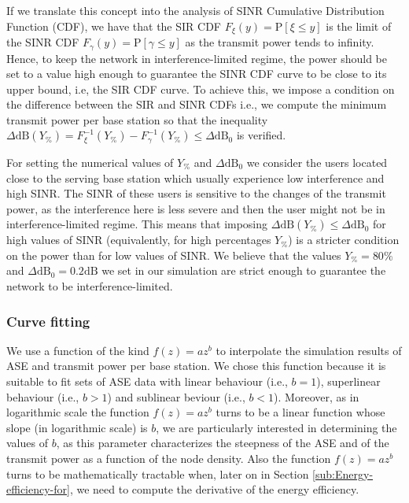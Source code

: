 \documentclass[twocoumn]{IEEEtran}
\begin{document}
If we translate this concept into the analysis of SINR Cumulative Distribution Function (CDF), we have that the SIR CDF $F_{\xi}(y)=\mathrm{P}[\xi\leq y]$ is the limit of the SINR CDF $F_{\gamma}(y)=\mathrm{P}[\gamma\leq y]$ as the transmit power tends to infinity. Hence, to keep the network in interference-limited regime, the power should be set to a value high enough to guarantee the SINR CDF curve to be close to its upper bound, i.e,  the SIR CDF curve. To achieve this, we impose a condition on the difference between the SIR
and SINR CDFs i.e., we compute the minimum transmit power per base station so that the inequality $\Delta\mathrm{dB}(Y_{\%})=F_{\xi}^{-1}(Y_{\%})-F_{\gamma}^{-1}(Y_{\%})\leq\Delta\mathrm{dB}_0$ is verified.

For setting the numerical values of $Y_{\%}$ and $\Delta\mathrm{dB}_0$ we consider the users located close to the serving base station which usually experience low interference and high SINR. The SINR of these users is sensitive to the changes of the transmit power, as the interference here is less severe and then the user might not be in interference-limited regime. This means that imposing $\Delta\mathrm{dB}(Y_{\%}) \leq \Delta\mathrm{dB}_0$ for high values of SINR (equivalently, for high percentages $Y_{\%}$) is a stricter condition on the power than for low values of SINR. We believe that the values $Y_{\%}=80\%$ and $\Delta\mathrm{dB}_0=0.2\mathrm{dB}$ we set in our simulation are strict enough to guarantee the network to be interference-limited.



\subsubsection{Curve fitting}

We use a function of the kind $f(z)=az^{b}$ to interpolate the simulation results of ASE and transmit power per base station. We chose this function because it is suitable to fit sets of ASE data with linear behaviour (i.e., $b=1$), superlinear behaviour (i.e., $b>1$) and sublinear beviour (i.e., $b<1$). Moreover, as in logarithmic scale the function $f(z)=az^{b}$ turns to be a linear function whose slope (in logarithmic scale) is $b$, we are particularly interested in determining the values of $b$, as this parameter characterizes the steepness
of the ASE and of the transmit power as a function of the node density. Also the function $f(z)=az^{b}$ turns to be mathematically tractable when,
later on in Section \eqref{sub:Energy-efficiency-for}, we need to
compute the derivative of the energy efficiency.
\end{document}
